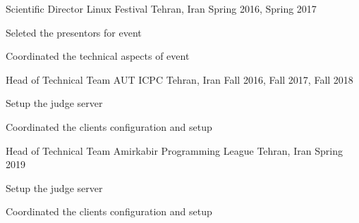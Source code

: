 

\begin{cventries}

  \cventry
    {Scientific Director} %
    {Linux Festival} %
    {Tehran, Iran} %
    {Spring 2016, Spring 2017} %
    {
      \begin{cvitems} %
        \item {Seleted the presentors for event}
        \item {Coordinated the technical aspects of event}
      \end{cvitems}
    }


  \cventry
    {Head of Technical Team} %
    {AUT ICPC} %
    {Tehran, Iran} %
    {Fall 2016, Fall 2017, Fall 2018} %
    {
      \begin{cvitems} %
        \item {Setup the judge server}
        \item {Coordinated the clients configuration and setup}
      \end{cvitems}
    }



  \cventry
    {Head of Technical Team} %
    {Amirkabir Programming League} %
    {Tehran, Iran} %
    {Spring 2019} %
    {
      \begin{cvitems} %
        \item {Setup the judge server}
        \item {Coordinated the clients configuration and setup}
      \end{cvitems}
    }

\end{cventries}
